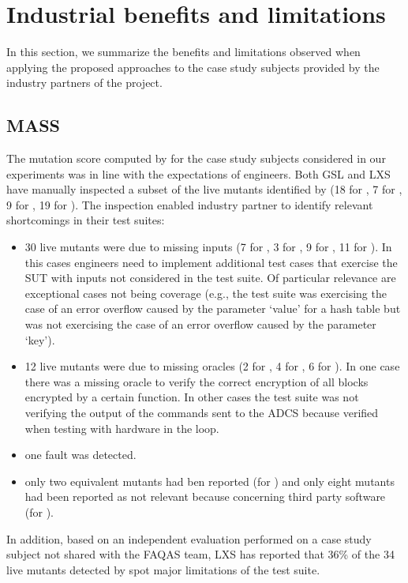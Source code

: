\clearpage
\section{Industrial benefits and limitations}
\label{sec:EvaluationRemarks}

In this section, we summarize the benefits and limitations observed when applying the proposed approaches to the  case study subjects provided by the industry partners of the project.

\subsection*{MASS}

The mutation score computed by \MASS for the case study subjects considered in our experiments was in line with the expectations of engineers. Both GSL and LXS have manually inspected a subset of the live mutants identified by \MASS (18 for \UTIL, 7 for \GCSP, 9 for \PARAM, 19 for \ESAIL). The inspection enabled industry partner to identify relevant shortcomings in their test suites: 
\begin{itemize}
\item 30 live mutants were due to missing inputs (7 for \UTIL, 3 for \GCSP, 9 for \PARAM, 11 for \ESAIL). In this cases engineers need to implement additional test cases that exercise the SUT with inputs not considered in the test suite. Of particular relevance are exceptional cases not being coverage (e.g., the test suite was exercising the case of an error overflow 
caused by the parameter ‘value’ for a hash table but was not exercising the case of an error overflow caused by the parameter ‘key’).
\item 12 live mutants were due to missing oracles (2 for \UTIL, 4 for \GCSP, 6 for \ESAIL). In one case there was a missing oracle to verify the correct encryption of all blocks encrypted by a certain function. In other cases the test suite was not verifying the output of the commands sent to the ADCS because verified when testing with hardware in the loop.
\item one fault was detected.
\item only two equivalent mutants had ben reported (for \ESAIL) and only eight mutants had been reported as not relevant because concerning third party software (for \UTIL).
\end{itemize}

In addition, based on an independent evaluation performed on a case study subject not shared with the FAQAS team, LXS has reported that 36\% of the 34 live mutants detected by \MASS spot major limitations of the test suite.

